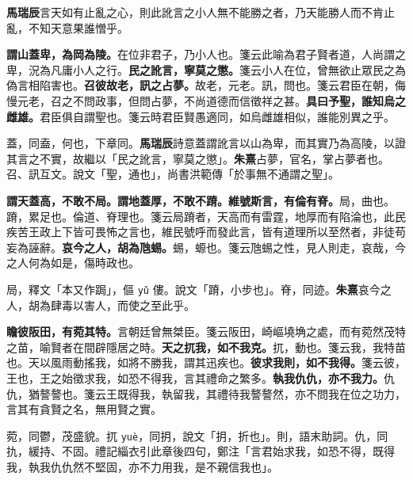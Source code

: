 \begin{quoting}\textbf{馬瑞辰}言天如有止亂之心，則此訛言之小人無不能勝之者，乃天能勝人而不肯止亂，不知天意果誰憎乎。\end{quoting}

\textbf{謂山蓋卑，為岡為陵。}{\footnotesize 在位非君子，乃小人也。箋云此喻為君子賢者道，人尚謂之卑，況為凡庸小人之行。}\textbf{民之訛言，寧莫之懲。}{\footnotesize 箋云小人在位，曾無欲止眾民之為偽言相陷害也。}\textbf{召彼故老，訊之占夢。}{\footnotesize 故老，元老。訊，問也。箋云君臣在朝，侮慢元老，召之不問政事，但問占夢，不尚道德而信徵祥之甚。}\textbf{具曰予聖，誰知烏之雌雄。}{\footnotesize 君臣俱自謂聖也。箋云時君臣賢愚適同，如烏雌雄相似，誰能別異之乎。}

\begin{quoting}蓋，同盍，何也，下章同。\textbf{馬瑞辰}詩意蓋謂訛言以山為卑，而其實乃為高陵，以證其言之不實，故繼以「民之訛言，寧莫之懲」。\textbf{朱熹}占夢，官名，掌占夢者也。召、訊互文。說文「聖，通也」，尚書洪範傳「於事無不通謂之聖」。\end{quoting}

\textbf{謂天蓋高，不敢不局。謂地蓋厚，不敢不蹐。維號斯言，有倫有脊。}{\footnotesize 局，曲也。蹐，累足也。倫道、脊理也。箋云局蹐者，天高而有雷霆，地厚而有陷淪也，此民疾苦王政上下皆可畏怖之言也，維民號呼而發此言，皆有道理所以至然者，非徒苟妄為誣辭。}\textbf{哀今之人，胡為虺蜴。}{\footnotesize 蜴，螈也。箋云虺蜴之性，見人則走，哀哉，今之人何為如是，傷時政也。}

\begin{quoting}局，釋文「本又作跼」，傴 \texttt{yǔ} 僂。說文「蹐，小步也」。脊，同迹。\textbf{朱熹}哀今之人，胡為肆毒以害人，而使之至此乎。\end{quoting}

\textbf{瞻彼阪田，有菀其特。}{\footnotesize 言朝廷曾無桀臣。箋云阪田，崎嶇墝埆之處，而有菀然茂特之苗，喻賢者在間辟隱居之時。}\textbf{天之扤我，如不我克。}{\footnotesize 扤，動也。箋云我，我特苗也。天以風雨動搖我，如將不勝我，謂其迅疾也。}\textbf{彼求我則，如不我得。}{\footnotesize 箋云彼，王也，王之始徵求我，如恐不得我，言其禮命之繁多。}\textbf{執我仇仇，亦不我力。}{\footnotesize 仇仇，猶謷謷也。箋云王既得我，執留我，其禮待我謷謷然，亦不問我在位之功力，言其有貪賢之名，無用賢之實。}

\begin{quoting}菀，同鬱，茂盛貌。扤 \texttt{yuè}，同抈，說文「抈，折也」。則，語末助詞。仇，同扏，緩持、不固。禮記緇衣引此章後四句，鄭注「言君始求我，如恐不得，既得我，執我仇仇然不堅固，亦不力用我，是不親信我也」。\end{quoting}

